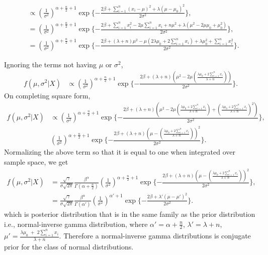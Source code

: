 \documentclass[a4paper,english,12pt]{article}
\begin{document}
\begin{enumerate}[label=(\alph*).]
\begin{align*}
&\propto (\frac{1}{\sigma^{2}})^{\alpha + \frac{n}{2} + 1} \exp\{-\frac{2\beta + \sum_{i=1}^{n}(x_{i}-\mu)^{2} + \lambda(\mu - \mu_{0})^{2}}{2\sigma^{2}}\},\\
&= (\frac{1}{\sigma^{2}})^{\alpha + \frac{n}{2} + 1} \exp\{-\frac{2\beta + \sum_{i=1}^{n}x_{i}^{2}- 2\mu\sum_{i=1}^{n}x_{i}+ n\mu^{2} + \lambda(\mu^{2} - 2\mu\mu_{0} + \mu_{0}^{2})}{2\sigma^{2}}\},\\
&= (\frac{1}{\sigma^{2}})^{\alpha + \frac{n}{2} + 1} \exp\{-\frac{2\beta + (\lambda + n)\mu^{2} - \mu(2\lambda\mu_{0} + 2\sum_{i=1}^{n} x_i) + \lambda\mu_{0}^{2} + \sum_{i=1}^{n} x_i^{2}}{2\sigma^{2}}\}.
\end{align*}
\end{enumerate}
Ignoring the terms not having $\mu$ or $\sigma^{2}$, 
\begin{align*}
f(\mu, \sigma^{2}| X)&\propto (\frac{1}{\sigma^{2}})^{\alpha + \frac{n}{2} + 1} \exp\{-\frac{2\beta + (\lambda + n)(\mu^{2} - 2\mu(\frac{\lambda\mu_{0} + 2\sum_{i=1}^{n} x_i }{\lambda + n}))}{2\sigma^{2}}\}.
\end{align*}
On completing square form,
\begin{align*}
f(\mu, \sigma^{2}| X)&\propto (\frac{1}{\sigma^{2}})^{\alpha + \frac{n}{2} + 1} \exp\{-\frac{2\beta + (\lambda + n)(\mu^{2} - 2\mu(\frac{\lambda\mu_{0} + 2\sum_{i=1}^{n} x_i }{\lambda + n}) + (\frac{\lambda\mu_{0} + 2\sum_{i=1}^{n} x_i }{\lambda + n})^{2} )}{2\sigma^{2}}\},\\
&(\frac{1}{\sigma^{2}})^{\alpha + \frac{n}{2} + 1} \exp\{-\frac{2\beta + (\lambda + n)(\mu - (\frac{\lambda\mu_{0} + 2\sum_{i=1}^{n} x_i }{\lambda + n}))^{2}}{2\sigma^{2}}\}.
\end{align*}
Normalizing the above term so that it is equal to one when integrated over sample space, we get
\begin{align*}
f(\mu, \sigma^{2}| X)&= \frac{\sqrt{\gamma}}{\sigma\sqrt{2\pi}} \frac{\beta^{\alpha}}{\Gamma(\alpha + \frac{n}{2})} (\frac{1}{\sigma^{2}})^{\alpha + \frac{n}{2} + 1}  \exp\{-\frac{2\beta + (\lambda + n)(\mu - (\frac{\lambda\mu_{0} + 2\sum_{i=1}^{n} x_i }{\lambda + n}))^{2}}{2\sigma^{2}}\},\\
&= \frac{\sqrt{\gamma}}{\sigma\sqrt{2\pi}} \frac{\beta^{\alpha}}{\Gamma(\alpha')} (\frac{1}{\sigma^{2}})^{\alpha' + 1}  \exp\{-\frac{2\beta + \lambda'(\mu - \mu')^{2}}{2\sigma^{2}}\}.
\end{align*}
which is posterior distribution that is in the same family as the prior distribution i.e., normal-inverse gamma distribution, where $\alpha' = \alpha + \frac{n}{2}$, $\lambda' = \lambda + n$, $\mu' = \frac{\lambda\mu_{0}\; +\; 2\sum_{i=1}^{n} x_i }{\lambda + n}$. Therefore a normal-inverse gamma distributions is conjugate prior for the class of normal distributions.
\end{document}
